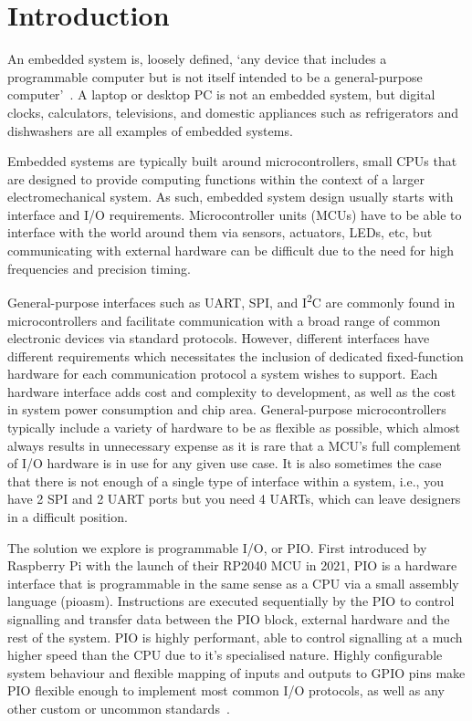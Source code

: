 \chapter{Introduction}
\label{ch:introduction}

An embedded system is, loosely defined, `any device that includes a programmable computer but is not itself intended to be a general-purpose
computer'~\cite{wolf}. A laptop or desktop PC is not an embedded system, but digital clocks, calculators, televisions, and domestic appliances such as refrigerators and dishwashers are all examples of embedded systems.

Embedded systems are typically built around microcontrollers, small CPUs that are designed to provide computing functions within the context of a larger electromechanical system. As such, embedded system design usually starts with interface and I/O requirements. Microcontroller units (MCUs) have to be able to interface with the world around them via sensors, actuators, LEDs, etc, but communicating with external hardware can be difficult due to the need for high frequencies and precision timing.

General-purpose interfaces such as UART, SPI, and I\textsuperscript{2}C are commonly found in microcontrollers and facilitate communication with a broad range of common electronic devices via standard protocols. However, different interfaces have different requirements which necessitates the inclusion of dedicated fixed-function hardware for each communication protocol a system wishes to support. Each hardware interface adds cost and complexity to development, as well as the cost in system power consumption and chip area. General-purpose microcontrollers typically include a variety of hardware to be as flexible as possible, which almost always results in unnecessary expense as it is rare that a MCU's full complement of I/O hardware is in use for any given use case. It is also sometimes the case that there is not enough of a single type of interface within a system, i.e., you have 2 SPI and 2 UART ports but you need 4 UARTs, which can leave designers in a difficult position.

The solution we explore is programmable I/O, or PIO. First introduced by Raspberry Pi with the launch of their RP2040 MCU in 2021, PIO is a hardware interface that is programmable in the same sense as a CPU via a small assembly language (pioasm). Instructions are executed sequentially by the PIO to control signalling and transfer data between the PIO block, external hardware and the rest of the system. PIO is highly performant, able to control signalling at a much higher speed than the CPU due to it's specialised nature. Highly configurable system behaviour and flexible mapping of inputs and outputs to GPIO pins make PIO flexible enough to implement most common I/O protocols, as well as any other custom or uncommon standards~\cite{rp2040}.

